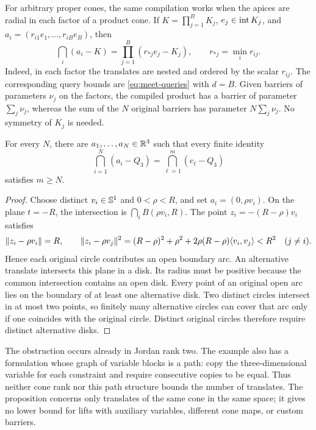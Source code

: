 For arbitrary proper cones, the same compilation works when the apices
are radial in each factor of a product cone. If $K=\prod_{j=1}^B K_j$, $e_j\in\operatorname{int} K_j$, and
$a_i=(r_{i1}e_1,\ldots,r_{iB}e_B)$, then
\begin{equation}\label{eq:radial-product-compiler}
 \bigcap_i(a_i-K)=\prod_{j=1}^B(r_{*j}e_j-K_j),
 \qquad r_{*j}=\min_i r_{ij}.
\end{equation}
Indeed, in each factor the translates are nested and ordered by the
scalar $r_{ij}$.
The corresponding query bounds are \eqref{eq:meet-queries} with $d=B$.
Given barriers of parameters $\nu_j$ on the factors, the compiled product
has a barrier of parameter $\sum_j\nu_j$, whereas the sum of the $N$
original barriers has parameter $N\sum_j\nu_j$. No symmetry of $K_j$ is needed.

\begin{proposition}
\label{prop:lorentz-translate-arcs}
For every $N$, there are $a_1,\ldots,a_N\in\mathbb R^3$ such that every finite
identity
\[
 \bigcap_{i=1}^N(a_i-Q_3)
   =\bigcap_{\ell=1}^m(c_\ell-Q_3)
\]
satisfies $m\geq N$.
\end{proposition}
\begin{proof}
Choose distinct $v_i\in\mathbb S^1$ and $0<\rho<R$, and set
$a_i=(0,\rho v_i)$. On the plane $t=-R$, the intersection is
$\bigcap_i B(\rho v_i,R)$. The point $z_i=-(R-\rho)v_i$ satisfies
\[
 \lVert z_i-\rho v_i\rVert=R,
 \qquad
 \lVert z_i-\rho v_j\rVert^2
 =(R-\rho)^2+\rho^2+2\rho(R-\rho)\langle v_i,v_j\rangle<R^2
 \quad(j\ne i).
\]
Hence each original circle contributes an open boundary arc. An
alternative translate intersects this plane in a disk. Its radius must
be positive because the common intersection contains an open disk.
Every point of an original open arc lies on the boundary of at least
one alternative disk. Two distinct circles intersect in at most two
points, so finitely many alternative circles can cover that arc only
if one coincides with the original circle. Distinct original circles
therefore require distinct alternative disks.
\end{proof}

The obstruction occurs already in Jordan rank two. The example also has
a formulation whose graph of variable blocks is a path: copy the
three-dimensional variable for each constraint and require consecutive
copies to be equal. Thus neither cone rank nor this path structure bounds
the number of translates. The proposition concerns only translates of the
same cone in the same space; it gives no lower bound for lifts with
auxiliary variables, different cone maps, or custom barriers.


